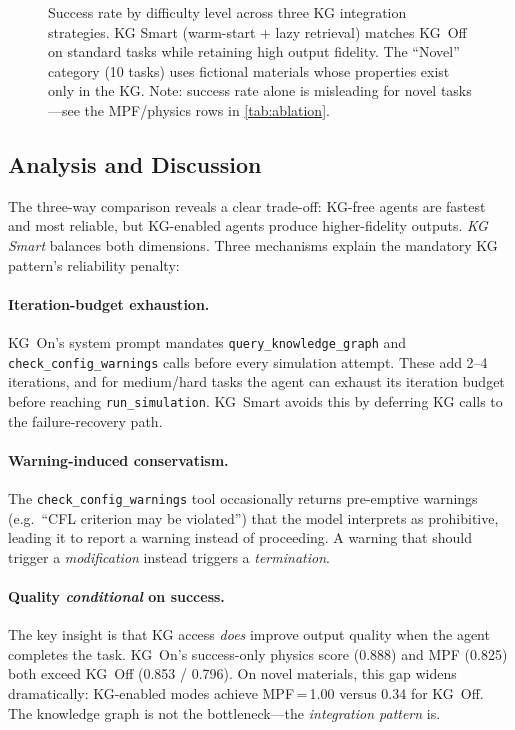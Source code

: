 \documentclass[twocolumn]{article}
\begin{document}
\begin{figure}[htbp]
  \centering
  
  \caption{Success rate by difficulty level across three KG integration
    strategies.  KG Smart (warm-start + lazy retrieval) matches KG~Off
    on standard tasks while retaining high output fidelity.
    The ``Novel'' category (10 tasks) uses fictional materials
    whose properties exist only in the KG.  Note: success rate alone
    is misleading for novel tasks---see the MPF/physics rows in
    \cref{tab:ablation}.}
  \label{fig:ablation}
\end{figure}

\subsection{Analysis and Discussion}
\label{sec:ablation-disc}

The three-way comparison reveals a clear trade-off: KG-free agents are
fastest and most reliable, but KG-enabled agents produce higher-fidelity
outputs.  \emph{KG Smart} balances both dimensions.  Three mechanisms
explain the mandatory KG pattern's reliability penalty:

\paragraph{Iteration-budget exhaustion.}
KG~On's system prompt mandates \texttt{query\_knowledge\_graph} and
\texttt{check\_config\_warnings} calls before every simulation attempt.
These add 2--4 iterations, and for medium/hard tasks the agent can
exhaust its iteration budget before reaching \texttt{run\_simulation}.
KG~Smart avoids this by deferring KG calls to the failure-recovery path.

\paragraph{Warning-induced conservatism.}
The \texttt{check\_config\_warnings} tool occasionally returns pre-emptive
warnings (e.g.\ ``CFL criterion may be violated'') that the model
interprets as prohibitive, leading it to report a warning instead of
proceeding.  A warning that should trigger a \emph{modification}
instead triggers a \emph{termination}.

\paragraph{Quality \emph{conditional} on success.}
The key insight is that KG access \emph{does} improve output quality
when the agent completes the task.  KG~On's success-only physics score
(0.888) and MPF (0.825) both exceed KG~Off (0.853 / 0.796).  On novel
materials, this gap widens dramatically: KG-enabled modes achieve
MPF\,=\,1.00 versus 0.34 for KG~Off.  The knowledge graph is not
the bottleneck---the \emph{integration pattern} is.
\end{document}
